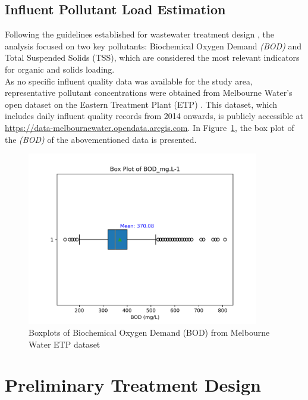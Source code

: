 \documentclass[12pt]{article}
\begin{document}



\subsection{Influent Pollutant Load Estimation}
\label{sec:pollutant_load}

Following the guidelines established for wastewater treatment design 
\cite{wef_DesignWaterResource, metcalf_2014_wastewater}, the analysis focused on two key 
pollutants: Biochemical Oxygen Demand \textit{(BOD)} and Total Suspended Solids (TSS), which 
are considered the most relevant indicators for organic and solids loading.\\

As no specific influent quality data was available for the study area, 
representative pollutant concentrations were obtained from Melbourne Water’s open 
dataset on the Eastern Treatment Plant (ETP) \cite{melbournewater_2024_etpdata}. 
This dataset, which includes daily influent quality records from 2014 onwards, is 
publicly accessible at \url{https://data-melbournewater.opendata.arcgis.com}.
In Figure~\ref{fig:boxplots_quality}, 
the box plot of the \textit{(BOD)} of the abovementioned data is presented. 



\begin{figure}[h]
  \centering
  \includegraphics[width=0.9\textwidth]{../images/boxPlot_BOD.png}
  \caption{Boxplots of Biochemical Oxygen Demand (BOD) from Melbourne Water ETP dataset}
  \label{fig:boxplots_quality}
\end{figure}

\section{Preliminary Treatment Design}
\label{sec:prelim_treatment}
\end{document}
